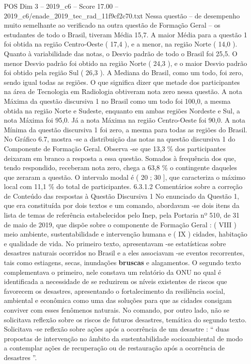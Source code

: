 \begin{textsample}{POS Dim 3 – 2019\_c6 – Score 17.00 – 2019\_c6/enade\_2019\_tec\_rad\_11f9cf2c70.txt}
Nessa questão – de desempenho muito semelhante ao verificado na outra questão de Formação Geral – os estudantes de todo o Brasil, tiveram Média 15,7.
A maior Média para a questão 1 foi obtida na região Centro-Oeste ( 17,4 ), e a menor, na região Norte ( 14,0 ).
Quanto à variabilidade das notas, o Desvio padrão de todo o Brasil foi 25,5.
O menor Desvio padrão foi obtido na região Norte ( 24,3 ), e o maior Desvio padrão foi obtido pela região Sul ( 26,3 ).
A Mediana do Brasil, como um todo, foi zero, sendo igual todas as regiões.
O que significa dizer que metade dos participantes na área de Tecnologia em Radiologia obtiveram nota zero nessa questão.
A nota Máxima da questão discursiva 1 no Brasil como um todo foi 100,0, a mesma obtida na região Norte e Sudeste, enquanto em ambas regiões Nordeste e Sul, a nota Máxima foi 95,0.
Já a nota Máxima na região Centro-Oeste foi 90,0.
A nota Mínima da questão discursiva 1 foi zero, a mesma para todas as regiões do Brasil.
No Gráfico 6.7, mostra -se a distribuição das notas na questão discursiva 1 do Componente de Formação Geral.
Observa -se que 13,3 \% dos participantes deixaram em branco a resposta a essa questão.
Somados à frequência dos que, tendo respondido, receberam nota zero, chega a 63,8 \% o contingente daqueles que zeraram a questão.
O intervalo modal é ( 20 ; 30 ], que caracteriza o máximo local com 11,1 \% do total de participantes. 6.3.1.2 Comentários sobre a correção de Conteúdo das respostas à Questão Discursiva 1 No enunciado da Questão 1, que era constituída por dois textos e um comando, abordavam -se dois itens da lista de temas de referência estabelecidos pelo Inep, pela Portaria nº 510, de 31 de maio de 2019, que dispõe sobre o componente de Formação Geral : ( VIII ) meio ambiente, sustentabilidade e intervenção humana e ( IX ) cidades, habitação e qualidade de vida.
No primeiro texto, apresentavam -se estatísticas sobre desastres naturais ocorridos no Brasil e a eles associavam -se eventos recorrentes, tais como estiagens, secas, inundações \textbf{bruscas} e alagamentos.
O segundo texto complementava o primeiro, nele constava um relatório da ONU no qual é identificada a necessidade de se reduzirem os níveis existentes de riscos que favorecem os desastres, apresentando o fortalecimento da resiliência social, ambiental e econômica como uma das soluções para que as cidades consigam conviver com esses fenômenos naturais.
No comando, por outro lado, não se solicitava reflexão sobre os riscos de futuros desastres, temática do segundo texto.
Solicitava -se reflexão sobre ações após a ocorrência de um desastre : “ duas propostas de intervenção no âmbito da sustentabilidade socioambiental de modo a contemplar ações de recuperação ou de restauração após a ocorrência de desastres ”.

\end{textsample}
